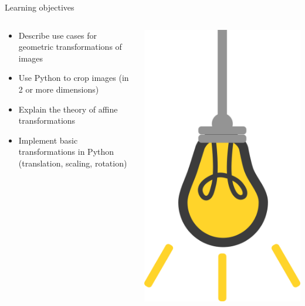 \documentclass[9pt, aspectratio=169]{beamer}
\begin{document}
\begin{frame}
    {Learning objectives}
    \begin{columns}
        \begin{column}{0.8\textwidth}
            \begin{itemize}
                \item Describe use cases for geometric transformations of images
                \item Use Python to crop images (in 2 or more dimensions)
                \item Explain the theory of affine transformations
                \item Implement basic transformations in Python (translation, scaling, rotation)
            \end{itemize}
        \end{column}
        \begin{column}{0.2\textwidth}
            \includegraphics[angle=-30, origin=tr, width=1.5\textwidth]{lightbulb.png}
        \end{column}
    \end{columns}
\end{frame}
\end{document}
